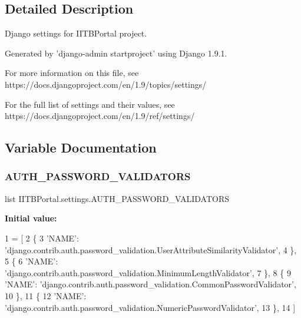 \subsection{Detailed Description}
\begin{DoxyVerb}Django settings for IITBPortal project.

Generated by 'django-admin startproject' using Django 1.9.1.

For more information on this file, see
https://docs.djangoproject.com/en/1.9/topics/settings/

For the full list of settings and their values, see
https://docs.djangoproject.com/en/1.9/ref/settings/
\end{DoxyVerb}
 

\subsection{Variable Documentation}
\mbox{\label{namespaceIITBPortal_1_1settings_a4b4c8b175b443dd9e6fddb005a86865e}} 
\subsubsection{\texorpdfstring{A\+U\+T\+H\+\_\+\+P\+A\+S\+S\+W\+O\+R\+D\+\_\+\+V\+A\+L\+I\+D\+A\+T\+O\+RS}{AUTH\_PASSWORD\_VALIDATORS}}
{\footnotesize\ttfamily list I\+I\+T\+B\+Portal.\+settings.\+A\+U\+T\+H\+\_\+\+P\+A\+S\+S\+W\+O\+R\+D\+\_\+\+V\+A\+L\+I\+D\+A\+T\+O\+RS}

{\bfseries Initial value\+:}
\begin{DoxyCode}
1 =  [
2     \{
3         \textcolor{stringliteral}{'NAME'}: \textcolor{stringliteral}{'django.contrib.auth.password\_validation.UserAttributeSimilarityValidator'},
4     \},
5     \{
6         \textcolor{stringliteral}{'NAME'}: \textcolor{stringliteral}{'django.contrib.auth.password\_validation.MinimumLengthValidator'},
7     \},
8     \{
9         \textcolor{stringliteral}{'NAME'}: \textcolor{stringliteral}{'django.contrib.auth.password\_validation.CommonPasswordValidator'},
10     \},
11     \{
12         \textcolor{stringliteral}{'NAME'}: \textcolor{stringliteral}{'django.contrib.auth.password\_validation.NumericPasswordValidator'},
13     \},
14 ]
\end{DoxyCode}
\mbox{\label{namespaceIITBPortal_1_1settings_aae1a758e2089449ce56af7f054742666}} 
